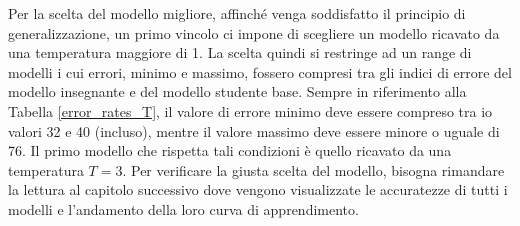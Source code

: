 Per la scelta del modello migliore, 
affinché venga soddisfatto il principio di generalizzazione, un primo vincolo 
ci impone di scegliere un modello ricavato da una temperatura maggiore di 
1. La scelta quindi si restringe ad un range di modelli i cui errori, minimo e 
massimo, fossero compresi tra gli indici di errore del modello insegnante e 
del modello studente base. Sempre in riferimento alla Tabella \ref{error_rates_T}, il valore 
di errore minimo deve essere compreso tra io valori 32 e 40 (incluso), mentre 
il valore massimo deve essere minore o uguale di 76. Il primo modello 
che rispetta tali condizioni è quello ricavato da una temperatura $T=3$. 
Per verificare la giusta scelta del modello, bisogna rimandare la lettura 
al capitolo successivo dove vengono visualizzate le accuratezze di tutti i 
modelli e l'andamento della loro curva di apprendimento.

